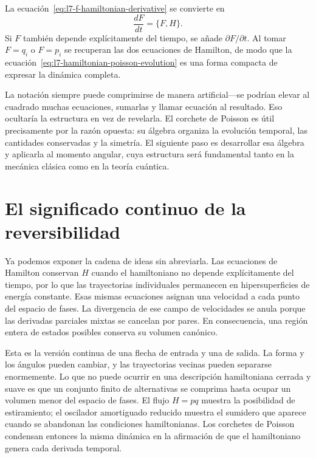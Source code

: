 La ecuación~\eqref{eq:l7-f-hamiltonian-derivative} se convierte en
\begin{equation}
  \boxed{\frac{dF}{dt}=\{F,H\}.}
  \label{eq:l7-hamiltonian-poisson-evolution}
\end{equation}
Si \(F\) también depende explícitamente del tiempo, se añade \(\partial F/\partial t\). Al tomar \(F=q_i\) o \(F=p_i\) se recuperan las dos ecuaciones de Hamilton, de modo que la ecuación~\eqref{eq:l7-hamiltonian-poisson-evolution} es una forma compacta de expresar la dinámica completa.

La notación siempre puede comprimirse de manera artificial---se podrían elevar al cuadrado muchas ecuaciones, sumarlas y llamar ecuación al resultado. Eso ocultaría la estructura en vez de revelarla. El corchete de Poisson es útil precisamente por la razón opuesta: su álgebra organiza la evolución temporal, las cantidades conservadas y la simetría. El siguiente paso es desarrollar esa álgebra y aplicarla al momento angular, cuya estructura será fundamental tanto en la mecánica clásica como en la teoría cuántica.

\section{El significado continuo de la reversibilidad}

Ya podemos exponer la cadena de ideas sin abreviarla. Las ecuaciones de Hamilton conservan \(H\) cuando el hamiltoniano no depende explícitamente del tiempo, por lo que las trayectorias individuales permanecen en hipersuperficies de energía constante. Esas mismas ecuaciones asignan una velocidad a cada punto del espacio de fases. La divergencia de ese campo de velocidades se anula porque las derivadas parciales mixtas se cancelan por pares. En consecuencia, una región entera de estados posibles conserva su volumen canónico.

Esta es la versión continua de una flecha de entrada y una de salida. La forma y los ángulos pueden cambiar, y las trayectorias vecinas pueden separarse enormemente. Lo que no puede ocurrir en una descripción hamiltoniana cerrada y suave es que un conjunto finito de alternativas se comprima hasta ocupar un volumen menor del espacio de fases. El flujo \(H=pq\) muestra la posibilidad de estiramiento; el oscilador amortiguado reducido muestra el sumidero que aparece cuando se abandonan las condiciones hamiltonianas. Los corchetes de Poisson condensan entonces la misma dinámica en la afirmación de que el hamiltoniano genera cada derivada temporal.
